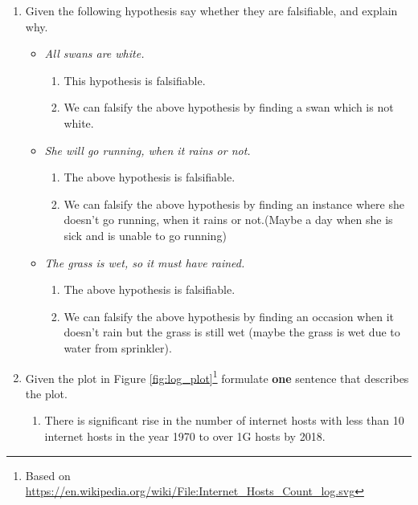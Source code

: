 \documentclass{resources/WeSTassignment}
\begin{document}
\begin{enumerate}
    \item Given the following hypothesis say whether they are falsifiable, and explain why.
        \begin{itemize}
            \item \emph{All swans are white.}
            \begin{enumerate}
            \item This hypothesis is falsifiable.
            \item We can falsify the above hypothesis by finding a swan which is not white.
            \end{enumerate}
            \item \emph{She will go running, when it rains or not.}
            \begin{enumerate}
            \item The above hypothesis is falsifiable.
            \item We can falsify the above hypothesis by finding an instance where she doesn't go running, when it rains or not.(Maybe a day when she is sick and is unable to go running)
            \end{enumerate}
            \item \emph{The grass is wet, so it must have rained.}
            \begin{enumerate}
            \item The above hypothesis is falsifiable.
            \item We can falsify the above hypothesis by finding an occasion when it doesn't rain but the grass is still wet (maybe the grass is wet due to water from sprinkler).
            \end{enumerate}
        \end{itemize}
    \item Given the plot in Figure \ref{fig:log_plot}\footnote{Based on       \url{https://en.wikipedia.org/wiki/File:Internet\_Hosts\_Count\_log.svg} }  formulate \textbf{one} sentence that describes the plot.
    \begin{enumerate}
    	\item There is significant rise in the number of internet hosts with less than 10 internet hosts in the year 1970 to over 1G hosts by 2018.
    \end{enumerate}
\end{enumerate}
\end{document}
